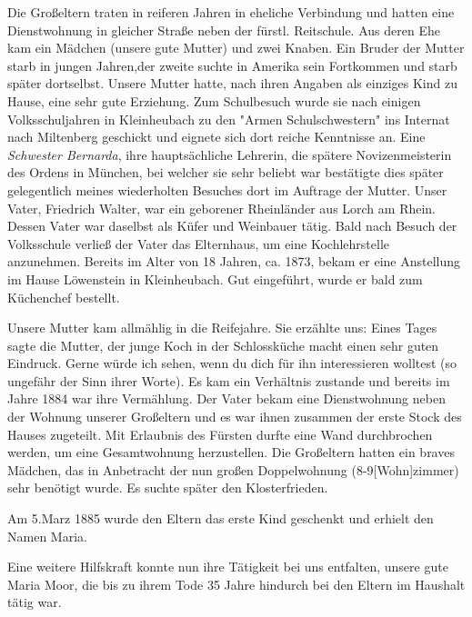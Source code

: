 \documentclass[a4paper,11pt]{article}
\begin{document}
Die Großeltern traten in reiferen Jahren in eheliche Verbindung und hatten eine Dienstwohnung in gleicher Straße neben der fürstl. Reitschule. Aus deren Ehe kam ein Mädchen (unsere gute Mutter) und zwei Knaben. Ein Bruder der Mutter starb in jungen Jahren,der zweite suchte in Amerika sein Fortkommen und starb später dortselbst. Unsere Mutter hatte, nach ihren Angaben als einziges Kind zu Hause, eine sehr gute Erziehung. Zum Schulbesuch wurde sie nach einigen Volksschuljahren in Kleinheubach zu den "Armen Schulschwestern" ins Internat nach Miltenberg geschickt und eignete sich dort reiche Kenntnisse an. Eine \textit{Schwester Bernarda}, ihre hauptsächliche Lehrerin, die spätere Novizenmeisterin des Ordens in München, bei welcher sie sehr beliebt war bestätigte dies später gelegentlich meines wiederholten Besuches dort im Auftrage der Mutter. Unser Vater, Friedrich Walter, war ein geborener Rheinländer aus Lorch am Rhein. Dessen Vater war daselbst als Küfer und Weinbauer tätig. Bald nach Besuch der Volksschule verließ der Vater das Elternhaus, um eine Kochlehrstelle anzunehmen. Bereits im Alter von 18 Jahren, ca. 1873, bekam er eine Anstellung im Hause Löwenstein in Kleinheubach. Gut eingeführt, wurde er bald zum Küchenchef bestellt.

Unsere Mutter kam allmählig in die Reifejahre. Sie erzählte uns: Eines Tages sagte die Mutter, der junge Koch in der Schlossküche macht einen sehr guten Eindruck. Gerne würde ich sehen, wenn du dich für ihn interessieren wolltest (so ungefähr der Sinn ihrer Worte). Es kam ein Verhältnis zustande und bereits im Jahre 1884 war ihre Vermählung. Der Vater bekam eine Dienstwohnung neben der Wohnung unserer Großeltern und es war ihnen zusammen der erste Stock des Hauses zugeteilt. Mit Erlaubnis des Fürsten durfte eine Wand durchbrochen werden, um eine Gesamtwohnung herzustellen. Die Großeltern hatten ein braves Mädchen, das in Anbetracht der nun großen Doppelwohnung (8-9[Wohn]zimmer) sehr benötigt wurde. Es suchte später den Klosterfrieden.

Am 5.Marz 1885 wurde den Eltern das erste Kind geschenkt und erhielt den Namen Maria.

Eine weitere Hilfskraft konnte nun ihre Tätigkeit bei uns entfalten, unsere gute Maria Moor, die bis zu ihrem Tode 35 Jahre hindurch bei den Eltern im Haushalt tätig war.
\end{document}
